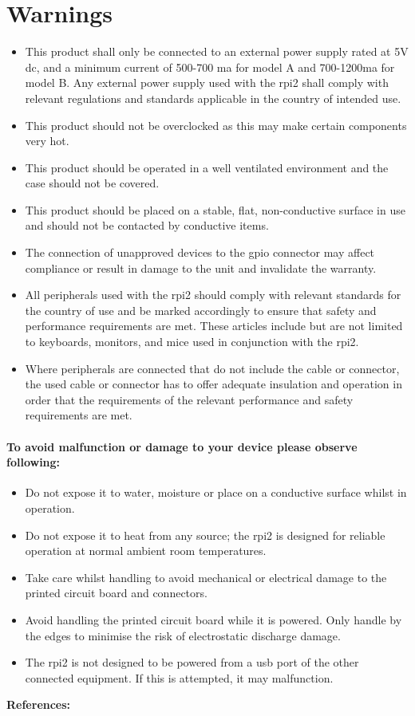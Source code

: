 \section{Warnings}
\begin{itemize}
\item This product shall only be connected to an external power supply rated at 5V dc, and a minimum current of 500-700 \gls{ma} for model A and 700-1200\gls{ma} for model B. Any external power supply used with the \gls{rpi2} shall comply with relevant regulations and standards applicable in the country of intended use. 
\item This product should not be overclocked as this may make certain components very hot. 
\item This product should be operated in a well ventilated environment and the case should not be covered. 
\item This product should be placed on a stable, flat, non-conductive surface in use and should not be contacted by conductive items. 
\item The connection of unapproved devices to the \gls{gpio} connector may affect compliance or result in damage to the unit and invalidate the warranty. 
\item All peripherals used with the \gls{rpi2} should comply with relevant standards for the country of use and be marked accordingly to ensure that safety and performance requirements are met. These articles include but are not limited to keyboards, monitors, and mice used in conjunction with the \gls{rpi2}.
\item Where peripherals are connected that do not include the cable or connector, the used cable or connector has to offer adequate insulation and operation in order that the requirements of the relevant performance and safety requirements are met.
\end{itemize}
\newpage
\paragraph{To avoid malfunction or damage to your device please observe following:}
\begin{itemize}
\item Do not expose it to water, moisture or place on a conductive surface whilst in operation.
\item Do not expose it to heat from any source; the \gls{rpi2} is designed for reliable operation at normal ambient room temperatures.
\item Take care whilst handling to avoid mechanical or electrical damage to the printed circuit board and connectors.
\item Avoid handling the printed circuit board while it is powered. Only handle by the edges to minimise the risk of electrostatic discharge damage.
\item The \gls{rpi2} is not designed to be powered from a \gls{usb} port of the other connected equipment. If this is attempted, it may malfunction.
\end{itemize}
\textbf{References: }\cite{Warnings}
\clearpageauthor


